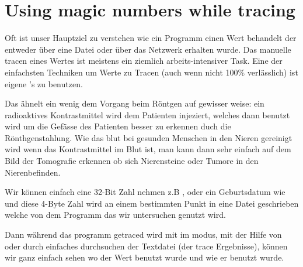 \section{Using magic numbers while tracing}

Oft ist unser Hauptziel zu verstehen wie ein Programm einen Wert behandelt der entweder über eine Datei oder über das Netzwerk erhalten wurde.
Das manuelle tracen eines Wertes ist meistens ein ziemlich arbeits-intensiver Task. Eine der einfachsten Techniken um Werte zu Tracen (auch wenn nicht 100\% verlässlich)
ist eigene 's zu benutzen. 


Das ähnelt ein wenig dem Vorgang beim Röntgen auf gewisser weise: ein radioaktives Kontrastmittel wird dem Patienten injeziert,
welches dann benutzt wird um die Gefässe des Patienten besser zu erkennen duch die Rönthgenstahlung. Wie das blut bei 
gesunden Menschen in den Nieren gereinigt wird wenn das Kontrastmittel im Blut ist, man kann dann sehr einfach auf dem
Bild der Tomografie erkennen ob sich Nierensteine oder Tumore in den Nierenbefinden. 


Wir können einfach eine 32-Bit Zahl nehmen z.B , oder ein Geburtsdatum wie 
und diese 4-Byte Zahl wird an einem bestimmten Punkt in eine Datei geschrieben welche von dem Programm 
das wir untersuchen genutzt wird. 


\myindex{\GrepUsage}

Dann während das programm getraced wird mit \tracer im  modus, mit der Hilfe von 
oder durch einfaches durchsuchen der Textdatei (der trace Ergebnisse), können wir ganz einfach sehen wo der 
Wert benutzt wurde und wie er benutzt wurde. 


